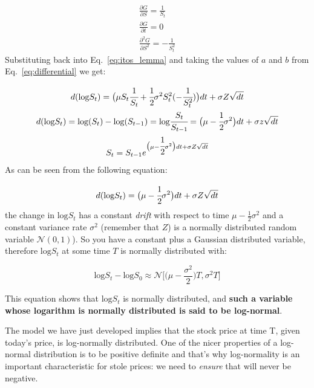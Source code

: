 \begin{equation}
\begin{gathered}
\frac{\partial G}{\partial S} = \frac{1}{S_t}\\
\frac{\partial G}{\partial t} = 0\\
\frac{\partial^2 G}{\partial S^2} = -\frac{1}{S_t^{2}}
\end{gathered}
\end{equation}
Substituting back into Eq.~\ref{eq:itos_lemma} and taking the values of $a$ and $b$ from Eq.~\ref{eq:differential} we get:

\begin{equation}
\begin{gathered}
d(\textrm{log} S_t) = \big(\mu S_t \cfrac{1}{S_t} + \cfrac{1}{2}\sigma^2 S_t^2 (-\cfrac{1}{S_t^2})\big)dt + \sigma Z\sqrt{dt}\\
d(\textrm{log} S_t) = \textrm{log} (S_t) - \textrm{log} (S_{t-1}) = \textrm{log} \cfrac{S_t}{S_{t-1}} = \big(\mu - \cfrac{1}{2}\sigma^2\big)dt + \sigma z\sqrt{dt}\\
S_t = S_{t-1}e^{\big(\mu - \cfrac{1}{2}\sigma^2\big)dt + \sigma Z\sqrt{dt}}
\end{gathered}
\label{eq:gbm_solution}
\end{equation}
As can be seen from the following equation:

\begin{equation}
d(\textrm{log} S_t) = \big(\mu - \cfrac{1}{2}\sigma^2\big)dt + \sigma Z\sqrt{dt}
\end{equation}
the change in \(\textrm{log} S_t\) has a constant \emph{drift} with respect to time \(\mu - \frac{1}{2}\sigma^2\) and a constant variance rate \(\sigma^2\)
(remember that $Z$) is a normally distributed random variable
\(\mathcal{N}(0,1)\)). So you have a constant plus a Gaussian
distributed variable, therefore \(\textrm{log} S_t\) at some time \(T\)
is normally distributed with:

\begin{equation}
\textrm{log}S_t - \textrm{log}S_0 \approx\mathcal{N}\big[\big(\mu-\frac{\sigma^2}{2}\big)T, \sigma^2 T\big]
\end{equation}

This equation shows that \(\textrm{log}S_t\) is normally distributed,
and \textbf{such a variable whose logarithm is normally distributed is said
to be log-normal}. 

The model we have just developed implies that
the stock price at time T, given today's price, is log-normally
distributed. One of the nicer properties of a log-normal distribution is to be positive definite and that's why log-normality is an important characteristic for stole prices: we need to \emph{ensure} that will never be negative. 

